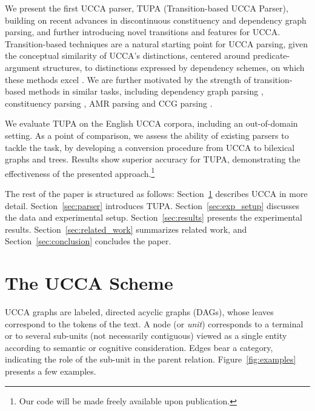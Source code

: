 \documentclass[11pt,a4paper]{article}
\newcommand{\parser}[1]{TUPA\textsubscript{#1}}
\newcommand{\secref}[1]{Section~\ref{#1}}
\newcommand{\figref}[1]{Figure~\ref{#1}}
\begin{document}
We present the first UCCA parser, \parser{}
(Transition-based UCCA Parser),
building on recent advances in discontinuous constituency
and dependency graph parsing, and further introducing novel transitions and features for UCCA.
Transition-based techniques are a natural
starting point for UCCA parsing, given the conceptual similarity of
UCCA's distinctions,
centered around predicate-argument structures, to distinctions expressed
by dependency schemes, on which these methods excel
\cite{dyer2015transition,andor2016globally,kiperwasser2016simple}.
We are further motivated by the strength of transition-based methods
in similar tasks, including dependency graph parsing
\cite{sagae2008shift,ribeyre-villemontedelaclergerie-seddah:2014:SemEval,tokgoz2015transition},
constituency parsing \cite{sagae2005classifier,zhang2009transition,zhu2013fast,maier2015discontinuous,maier-lichte:2016:DiscoNLP},
AMR parsing \cite{wang-xue-pradhan:2015:ACL-IJCNLP,wang2015transition,wang-EtAl:2016:SemEval,dipendra2016neural,goodman2016noise,zhou2016amr,damonte2016incremental}
and CCG parsing \cite{zhang2011shift,ambati2015incremental,ambati-deoskar-steedman:2016:N16-1}.

We evaluate \parser{} on the English UCCA corpora, including an out-of-domain setting.
As a point of comparison, we assess the ability of existing
parsers to tackle the task, by developing a conversion procedure
from UCCA to bilexical graphs and trees.
Results show superior accuracy for \parser{}, demonstrating the effectiveness of
the presented approach.\footnote{Our code will be made freely available upon publication.}

The rest of the paper is structured as follows:
\secref{sec:ucca} describes UCCA in more detail.
\secref{sec:parser} introduces \parser{}.
\secref{sec:exp_setup} discusses the data and experimental setup.
\secref{sec:results} presents the experimental results.
\secref{sec:related_work} summarizes related work, and
\secref{sec:conclusion} concludes the paper.




\section{The UCCA Scheme}\label{sec:ucca}

UCCA graphs are labeled, directed acyclic graphs (DAGs),
whose leaves correspond to the tokens of
the text. A node (or {\it unit}) corresponds to a terminal or
to several sub-units (not necessarily contiguous) viewed as a
single entity according to semantic or cognitive consideration.
Edges bear a category, indicating the role of the sub-unit in the parent relation.
\figref{fig:examples} presents a few examples.
\end{document}
